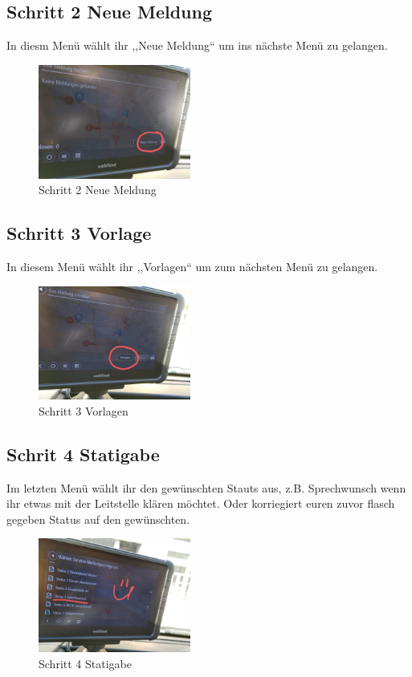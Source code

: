 \documentclass[a4paper,12pt]{scrartcl}
\begin{document}
    \subsection{Schritt 2 Neue Meldung}
    In diesm Menü wählt ihr ,,Neue Meldung`` um ins nächste Menü zu gelangen.
    \begin{figure}[h]
        \begin{center}
            \includegraphics[width=5cm]{bilder/Schritt2.jpg}
            \caption{Schritt 2 Neue Meldung}
            \label{Neue Meldung}
        \end{center} 
    \end{figure}

    \newpage
    \subsection{Schritt 3 Vorlage}
    In diesem Menü wählt ihr ,,Vorlagen`` um zum nächsten Menü zu gelangen.
    \begin{figure}[h]
        \begin{center}
            \includegraphics[width=5cm]{bilder/Schritt3.jpg}
            \caption{Schritt 3 Vorlagen}
            \label{Vorlagen}
        \end{center} 
    \end{figure}

    \subsection{Schrit 4 Statigabe}
    Im letzten Menü wählt ihr den gewünschten Stauts aus, z.B. Sprechwunsch wenn ihr etwas mit der Leitstelle
    klären möchtet. Oder korriegiert euren zuvor flasch gegeben Status auf den gewünschten.
    \begin{figure}[h]
        \begin{center}
            \includegraphics[width=5cm]{bilder/Schritt4.jpg}
            \caption{Schritt 4 Statigabe}
            \label{Statigabe}
        \end{center} 
    \end{figure}
\end{document}
